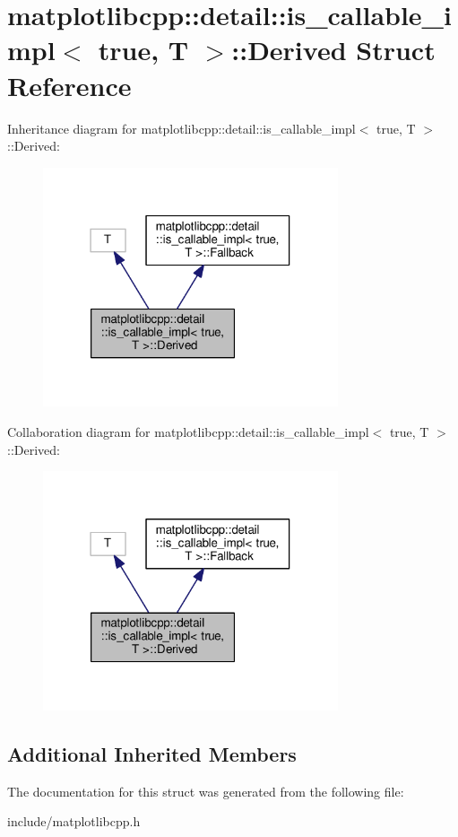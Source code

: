 \hypertarget{structmatplotlibcpp_1_1detail_1_1is__callable__impl_3_01true_00_01T_01_4_1_1Derived}{}\section{matplotlibcpp\+:\+:detail\+:\+:is\+\_\+callable\+\_\+impl$<$ true, T $>$\+:\+:Derived Struct Reference}
\label{structmatplotlibcpp_1_1detail_1_1is__callable__impl_3_01true_00_01T_01_4_1_1Derived}


Inheritance diagram for matplotlibcpp\+:\+:detail\+:\+:is\+\_\+callable\+\_\+impl$<$ true, T $>$\+:\+:Derived\+:
\nopagebreak
\begin{figure}[H]
\begin{center}
\leavevmode
\includegraphics[width=247pt]{structmatplotlibcpp_1_1detail_1_1is__callable__impl_3_01true_00_01T_01_4_1_1Derived__inherit__graph}
\end{center}
\end{figure}


Collaboration diagram for matplotlibcpp\+:\+:detail\+:\+:is\+\_\+callable\+\_\+impl$<$ true, T $>$\+:\+:Derived\+:
\nopagebreak
\begin{figure}[H]
\begin{center}
\leavevmode
\includegraphics[width=247pt]{structmatplotlibcpp_1_1detail_1_1is__callable__impl_3_01true_00_01T_01_4_1_1Derived__coll__graph}
\end{center}
\end{figure}
\subsection*{Additional Inherited Members}


The documentation for this struct was generated from the following file\+:\begin{DoxyCompactItemize}
\item 
include/matplotlibcpp.\+h\end{DoxyCompactItemize}
